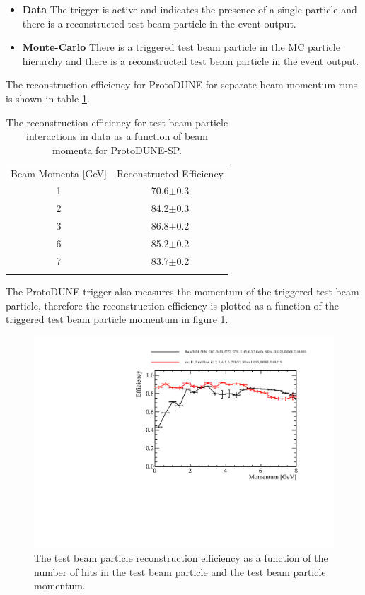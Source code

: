 \begin{itemize}
    \item \textbf{Data} The trigger is active and indicates the presence of a single particle and there is a reconstructed test beam particle in the event output.
    \item \textbf{Monte-Carlo} There is a triggered test beam particle in the MC particle hierarchy and there is a reconstructed test beam particle in the event output.
\end{itemize}

The reconstruction efficiency for ProtoDUNE for separate beam momentum runs is shown in table \ref{tab:dataeff}.  

\begin{table}
\centering
\caption{The reconstruction efficiency for test beam particle interactions in data as a function of beam momenta for ProtoDUNE-SP.}
\label{tab:dataeff} 
\begin{tabular}{cc}
\hline\noalign{\smallskip}
Beam Momenta [GeV] & Reconstructed Efficiency  \\
\noalign{\smallskip}\hline\noalign{\smallskip}
1 & 70.6$\pm$0.3 \\
2 & 84.2$\pm$0.3 \\
3 & 86.8$\pm$0.2 \\
6 & 85.2$\pm$0.2 \\
7 & 83.7$\pm$0.2 \\
\noalign{\smallskip}\hline
\end{tabular}
\end{table}

The ProtoDUNE trigger also measures the momentum of the triggered test beam particle, therefore the reconstruction efficiency is plotted as a function of the triggered test beam particle momentum in figure \ref{fig:datamcrecoeff}.  

\begin{figure}
\includegraphics[width=1.0\textwidth]{Figures/Metrics/Data/Beam/BeamParticleEfficiencyVsMomentum.pdf}
\caption{The test beam particle reconstruction efficiency as a function of the number of hits in the test beam particle and the test beam particle momentum.}
\label{fig:datamcrecoeff}
\end{figure}

